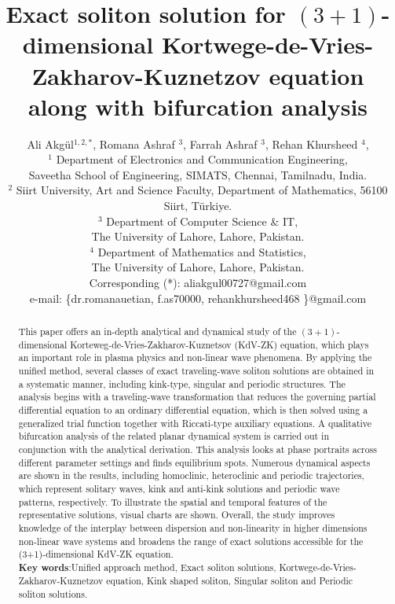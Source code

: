 \documentclass{article}
\date{}
\numberwithin{equation}{section}
\begin{document}
\title{ \textbf{Exact soliton solution for $(3+1)$-dimensional Kortwege-de-Vries-Zakharov-Kuznetzov equation along with bifurcation analysis  }}
\author{ Ali Akg\"{u}l$^{1,2,*}$, Romana Ashraf $^{3}$, Farrah Ashraf $^{3}$, Rehan Khursheed $^{4}$,  \\
$^{1}$ Department of Electronics and Communication Engineering,\\ Saveetha School of Engineering,
SIMATS, Chennai, Tamilnadu, India.\\
$^{2}$ Siirt University, Art and Science Faculty, Department of Mathematics, 56100 Siirt, Türkiye.\\
$^{3}$ Department of Computer Science $ \& $ IT,\\ The University of Lahore, Lahore, Pakistan.\\
$^{4}$ Department of Mathematics and Statistics,\\ The University of Lahore, Lahore, Pakistan.\\
Corresponding (*): aliakgul00727@gmail.com\\
e-mail: \{dr.romanauetian, f.as70000, rehankhursheed468 \}@gmail.com }
\date{ }
\maketitle
\begin{abstract}
\noindent
This paper offers an in-depth analytical and dynamical study of the $(3+1)$-dimensional Korteweg-de-Vries-Zakharov-Kuznetsov (KdV-ZK) equation, which plays an important role in plasma physics and non-linear wave phenomena. By applying the unified method, several classes of exact traveling-wave soliton solutions are obtained in a systematic manner, including kink-type, singular and periodic structures. The analysis begins with a traveling-wave transformation that reduces the governing partial differential equation to an ordinary differential equation, which is then solved using a generalized trial function together with Riccati-type auxiliary equations. A qualitative bifurcation analysis of the related planar dynamical system is carried out in conjunction with the analytical derivation. This analysis looks at phase portraits across different parameter settings and finds equilibrium spots. Numerous dynamical aspects are shown in the results, including homoclinic, heteroclinic and periodic trajectories, which represent solitary waves, kink and anti-kink solutions and periodic wave patterns, respectively. To illustrate the spatial and temporal features of the representative solutions, visual charts are shown. Overall, the study improves knowledge of the interplay between dispersion and non-linearity in higher dimensions non-linear wave systems and broadens the range of exact solutions accessible for the (3+1)-dimensional KdV-ZK equation.\\
\textbf{Key words}:Unified approach method, Exact soliton solutions, Kortwege-de-Vries-Zakharov-Kuznetzov equation, Kink shaped soliton, Singular soliton and Periodic soliton solutions.
\end{abstract}
\end{document}

